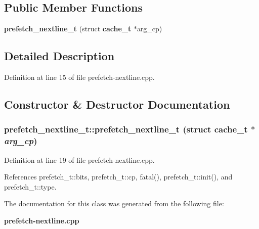 \subsection*{Public Member Functions}
\begin{CompactItemize}
\item 
{\bf prefetch\_\-nextline\_\-t} (struct {\bf cache\_\-t} $\ast$arg\_\-cp)
\end{CompactItemize}


\subsection{Detailed Description}


Definition at line 15 of file prefetch-nextline.cpp.

\subsection{Constructor \& Destructor Documentation}
\subsubsection[{prefetch\_\-nextline\_\-t}]{\setlength{\rightskip}{0pt plus 5cm}prefetch\_\-nextline\_\-t::prefetch\_\-nextline\_\-t (struct {\bf cache\_\-t} $\ast$ {\em arg\_\-cp})\hspace{0.3cm}{\tt  [inline]}}\label{classprefetch__nextline__t_6363ced0b7a39b024c645e376becc967}




Definition at line 19 of file prefetch-nextline.cpp.

References prefetch\_\-t::bits, prefetch\_\-t::cp, fatal(), prefetch\_\-t::init(), and prefetch\_\-t::type.

The documentation for this class was generated from the following file:\begin{CompactItemize}
\item 
{\bf prefetch-nextline.cpp}\end{CompactItemize}
